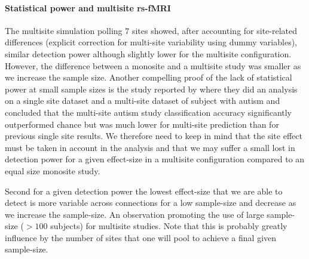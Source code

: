 \documentclass[authoryear]{elsarticle}
\begin{document}
\paragraph{Statistical power and multisite rs-fMRI} The multisite simulation polling 7 sites showed, after accounting for site-related differences (explicit correction for multi-site variability using dummy variables), similar detection power although slightly lower for the multisite configuration. However, the difference between a monosite and a multisite study was smaller as we increase the sample size. Another compelling proof of the lack of statistical power at small sample sizes is the study reported by \cite{Nielsen2013} where they did an analysis on a single site dataset and a multi-site dataset of subject with autism and concluded that the multi-site autism study classification accuracy significantly outperformed chance but was much lower for multi-site prediction than for previous single site results. We therefore need to keep in mind that the site effect must be taken in account in the analysis and that we may suffer a small lost in detection power for a given effect-size in a multisite configuration compared to an equal size monosite study.\\
\par
Second for a given detection power the lowest effect-size that we are able to detect is more variable across connections for a low sample-size and decrease as we increase the sample-size.  
An observation promoting the use of large sample-size ($>100$ subjects) for multisite studies. Note that this is probably greatly influence by the number of sites that one will pool to achieve a final given sample-size. 


\end{document}

